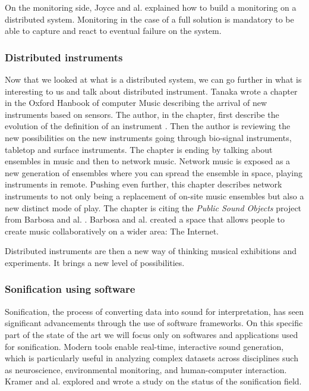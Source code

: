 On the monitoring side, Joyce and al. \cite{joyceMonitoringDistributedSystems} explained how to build a monitoring
on a distributed system. Monitoring in the case of a full solution is mandatory to be able to capture and react to eventual
failure on the system.




\subsubsection{Distributed instruments}

Now that we looked at what is a distributed system, we can go further in what is interesting to us and talk about distributed instrument. Tanaka wrote a chapter in the Oxford Hanbook of computer Music \cite{deanOxfordHandbookComputer2009} describing the arrival of new instruments based on sensors.
The author, in the chapter, first describe the evolution of the definition of an instrument \cite{tanaka2009sensor}.
Then the author is reviewing the new possibilities on the new instruments going through bio-signal instruments, tabletop
and surface instruments. The chapter is ending by talking about ensembles in music and then to network music.
Network music is exposed as a new generation of ensembles where you can spread the ensemble in space, playing
instruments in remote. Pushing even further, this chapter describes network instruments to not only being a replacement
of on-site music ensembles but also a new distinct mode of play.
The chapter is citing the \textit{Public Sound Objects} project from Barbosa and al. \cite{barbosaPublicSoundObjects2002}.
Barbosa and al. created a space that allows people to create music collaboratively on a wider area: The Internet.



Distributed instruments are then a new way of thinking musical exhibitions and experiments. It brings a new level of possibilities.





\subsubsection{Sonification using software}

Sonification, the process of converting data into sound for interpretation, has seen significant advancements through the use of software frameworks. On this specific part of the state of the art we will focus only on softwares and applications used for sonification. Modern tools enable real-time, interactive sound generation, which is particularly useful in analyzing complex datasets across disciplines such as neuroscience, environmental monitoring, and human-computer interaction. Kramer and al. \cite{kramerSonificationReportStatusb} explored and wrote a study on the status of the sonification field.

